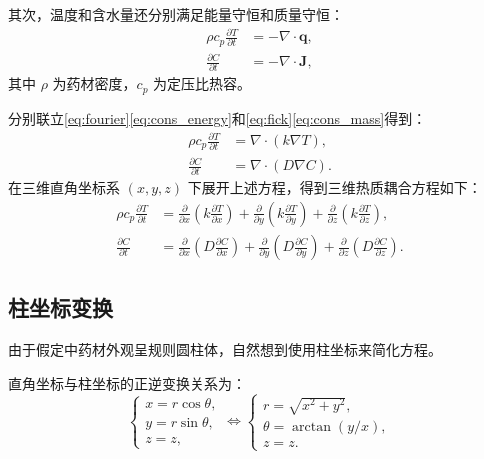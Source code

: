 \documentclass[12pt,a4paper,fontset=none]{ctexart}
\begin{document}
其次，温度和含水量还分别满足能量守恒和质量守恒：
\begin{align}
\rho c_p\frac{\partial T}{\partial t} &= -\nabla\cdot\mathbf{q},\label{eq:cons_energy}\\
\frac{\partial C}{\partial t} &= -\nabla\cdot\mathbf{J},\label{eq:cons_mass}
\end{align}
其中 $\rho$ 为药材密度，$c_p$ 为定压比热容。

分别联立\eqref{eq:fourier}\eqref{eq:cons_energy}和\eqref{eq:fick}\eqref{eq:cons_mass}得到：
\begin{align}
\rho c_p\frac{\partial T}{\partial t} &= \nabla\cdot(k\nabla T),\label{eq:div_heat}\\
\frac{\partial C}{\partial t} &= \nabla\cdot(D\nabla C).\label{eq:div_mass}
\end{align}
在三维直角坐标系 $(x,y,z)$ 下展开上述方程，得到三维热质耦合方程如下：
\begin{align}
\rho c_p\frac{\partial T}{\partial t}
&=\frac{\partial}{\partial x}\left(k\frac{\partial T}{\partial x}\right)
+\frac{\partial}{\partial y}\left(k\frac{\partial T}{\partial y}\right)
+\frac{\partial}{\partial z}\left(k\frac{\partial T}{\partial z}\right),\label{eq:cartesian_heat}\\
\frac{\partial C}{\partial t}
&=\frac{\partial}{\partial x}\left(D\frac{\partial C}{\partial x}\right)
+\frac{\partial}{\partial y}\left(D\frac{\partial C}{\partial y}\right)
+\frac{\partial}{\partial z}\left(D\frac{\partial C}{\partial z}\right).\label{eq:cartesian_mass}
\end{align}

\subsection{柱坐标变换}
由于假定中药材外观呈规则圆柱体，自然想到使用柱坐标来简化方程。

直角坐标与柱坐标的正逆变换关系为：
\begin{equation}
\begin{cases}
x = r\cos\theta,\\
y = r\sin\theta,\\
z = z,
\end{cases}
\iff
\begin{cases}
r = \sqrt{x^2+y^2},\\[4pt]
\theta = \arctan(y/x),\\[4pt]
z = z.
\end{cases}
\end{equation}
\end{document}
